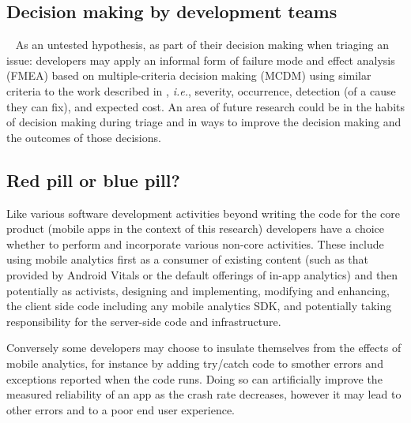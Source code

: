 \subsection{Decision making by development teams}~\label{discussion-decision-making-by-dev-teams-section}
As an untested hypothesis, as part of their decision making when triaging an issue: developers may apply an informal form of failure mode and effect analysis (FMEA) based on multiple-criteria decision making (MCDM) using similar criteria to the work described in , \textit{i.e.}, severity, occurrence, detection (of a cause they can fix), and expected cost. An area of future research could be in the habits of decision making during triage and in ways to improve the decision making and the outcomes of those decisions.


\subsection{Red pill or blue pill?}
Like various software development activities beyond writing the code for the core product (mobile apps in the context of this research) developers have a choice whether to perform and incorporate various non-core activities. These include using mobile analytics first as a consumer of existing content (such as that provided by Android Vitals or the default offerings of in-app analytics) and then potentially as activists, designing and implementing, modifying and enhancing, the client side code including any mobile analytics SDK, and potentially taking responsibility for the server-side code and infrastructure. 

Conversely some developers may choose to insulate themselves from the effects of mobile analytics, for instance by adding try/catch code to smother errors and exceptions reported when the code runs. Doing so can artificially improve the measured reliability of an app as the crash rate decreases, however it may lead to other errors and to a poor end user experience.


